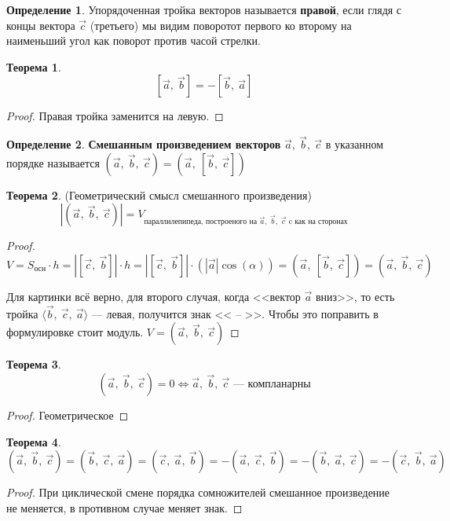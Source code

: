 \documentclass{article}
\theoremstyle{definition}
\newtheorem{definition}{Определение}
\newtheorem{theorem}{Теорема}[section]
\begin{document}
\begin{definition}
Упорядоченная тройка векторов называется \textbf{правой}, если глядя с концы вектора $\vec c$ (третьего) мы видим поворотот первого ко второму на наименьший угол как поворот против часой стрелки.
\end{definition}

\begin{theorem}
$$[\vec a,\ \vec b] = - [\vec b,\ \vec a]$$
\begin{proof}
Правая тройка заменится на левую.
\end{proof}
\end{theorem}


\begin{definition}
\textbf{Смешанным произведением векторов} $\vec a,\ \vec b,\ \vec c$ в указанном порядке называется  $(\vec a,\ \vec b,\ \vec c) = (\vec a,\ [\vec b,\ \vec c])$ 
\end{definition}

\begin{theorem}{(Геометрический смысл смешанного произведения)}
$$|(\vec a,\ \vec b,\ \vec c)| = V_{\textrm{параллилепипеда, построеного на } \vec a,\ \vec b,\ \vec c \textrm{ c как на сторонах}}$$

\begin{proof}
$V = S_{\textrm{осн}}\cdot h = \left|[\vec c,\ \vec b]\right|\cdot h = \left|[\vec c,\ \vec b]\right|\cdot (|\vec a|\cos{(\alpha)}) = (\vec a,\ [\vec b,\ \vec c]) = (\vec a,\ \vec b,\ \vec c)$

Для картинки всё верно, для второго случая, когда <<вектор $\vec a$ вниз>>, то есть тройка $\langle \vec b,\ \vec c,\ \vec a \rangle$ --- левая, получится знак << -- >>. Чтобы это поправить в формулировке стоит модуль.
$V = (\vec a,\ \vec b,\ \vec c)$
\end{proof}
\end{theorem}

\begin{theorem}
$$(\vec a,\ \vec b,\ \vec c) = 0 \Longleftrightarrow \vec a,\ \vec b,\ \vec c \textrm{ --- компланарны}$$
\begin{proof}
Геометрическое
\end{proof}
\end{theorem}

\begin{theorem}
$$(\vec a,\ \vec b,\ \vec c) = (\vec b,\ \vec c,\ \vec a) = (\vec c,\ \vec a,\ \vec b) = - (\vec a,\ \vec c,\ \vec b) = - (\vec b,\ \vec a,\ \vec c) = -  (\vec c,\ \vec b,\ \vec a)$$
\begin{proof}
При циклической смене порядка сомножителей смешанное произведение не меняется, в противном случае меняет знак.
\end{proof}
\end{theorem}
\end{document}
